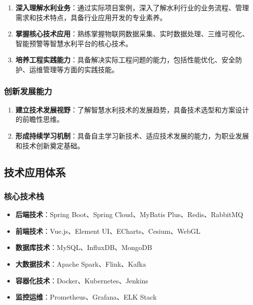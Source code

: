 \begin{enumerate}
\def\labelenumi{\arabic{enumi}.}
\setcounter{enumi}{3}
\item
  \textbf{深入理解水利业务}：通过实际项目案例，深入了解水利行业的业务流程、管理需求和技术特点，具备行业应用开发的专业素养。
\item
  \textbf{掌握核心技术应用}：熟练掌握物联网数据采集、实时数据处理、三维可视化、智能预警等智慧水利平台的核心技术。
\item
  \textbf{培养工程实践能力}：具备解决实际工程问题的能力，包括性能优化、安全防护、运维管理等方面的实践技能。
\end{enumerate}

\subsubsection{创新发展能力}\label{ux521bux65b0ux53d1ux5c55ux80fdux529b}

\begin{enumerate}
\def\labelenumi{\arabic{enumi}.}
\setcounter{enumi}{6}
\item
  \textbf{建立技术发展视野}：了解智慧水利技术的发展趋势，具备技术选型和方案设计的前瞻性思维。
\item
  \textbf{形成持续学习机制}：具备自主学习新技术、适应技术发展的能力，为职业发展和技术创新奠定基础。
\end{enumerate}

\subsection{技术应用体系}\label{ux6280ux672fux5e94ux7528ux4f53ux7cfb}

\subsubsection{核心技术栈}\label{ux6838ux5fc3ux6280ux672fux6808}

\begin{itemize}
\tightlist
\item
  \textbf{后端技术}：Spring Boot、Spring Cloud、MyBatis
  Plus、Redis、RabbitMQ
\item
  \textbf{前端技术}：Vue.js、Element UI、ECharts、Cesium、WebGL
\item
  \textbf{数据库技术}：MySQL、InfluxDB、MongoDB
\item
  \textbf{大数据技术}：Apache Spark、Flink、Kafka
\item
  \textbf{容器化技术}：Docker、Kubernetes、Jenkins
\item
  \textbf{监控运维}：Prometheus、Grafana、ELK Stack
\end{itemize}

